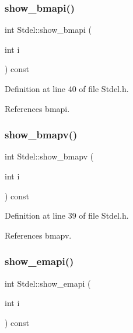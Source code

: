 \mbox{\label{classStdel_ad3a0646ad7ec2567e46da36285dee331}} 
\subsubsection{\texorpdfstring{show\+\_\+bmapi()}{show\_bmapi()}}
{\footnotesize\ttfamily int Stdel\+::show\+\_\+bmapi (\begin{DoxyParamCaption}\item[{int}]{i }\end{DoxyParamCaption}) const\hspace{0.3cm}{\ttfamily [inline]}}



Definition at line 40 of file Stdel.\+h.



References bmapi.

\mbox{\label{classStdel_ac8787dabfb1d767b89e39806522c1161}} 
\subsubsection{\texorpdfstring{show\+\_\+bmapv()}{show\_bmapv()}}
{\footnotesize\ttfamily int Stdel\+::show\+\_\+bmapv (\begin{DoxyParamCaption}\item[{int}]{i }\end{DoxyParamCaption}) const\hspace{0.3cm}{\ttfamily [inline]}}



Definition at line 39 of file Stdel.\+h.



References bmapv.

\mbox{\label{classStdel_aca7fb885191a952c013e930521a42213}} 
\subsubsection{\texorpdfstring{show\+\_\+emapi()}{show\_emapi()}}
{\footnotesize\ttfamily int Stdel\+::show\+\_\+emapi (\begin{DoxyParamCaption}\item[{int}]{i }\end{DoxyParamCaption}) const\hspace{0.3cm}{\ttfamily [inline]}}



